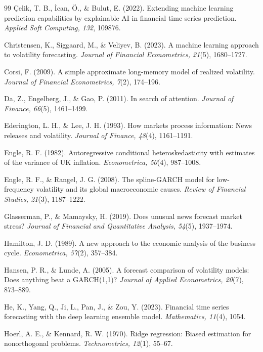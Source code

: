 \documentclass[review]{elsarticle}
\begin{document}
\begin{thebibliography}{99}
\c{C}elik, T. B., \.{I}can, \"{O}., \& Bulut, E. (2022). Extending machine learning prediction capabilities by explainable AI in financial time series prediction. \emph{Applied Soft Computing, 132}, 109876.

Christensen, K., Siggaard, M., \& Veliyev, B. (2023). A machine learning approach to volatility forecasting. \emph{Journal of Financial Econometrics, 21}(5), 1680--1727.

Corsi, F. (2009). A simple approximate long-memory model of realized volatility. \emph{Journal of Financial Econometrics, 7}(2), 174--196.

Da, Z., Engelberg, J., \& Gao, P. (2011). In search of attention. \emph{Journal of Finance, 66}(5), 1461--1499.

Ederington, L. H., \& Lee, J. H. (1993). How markets process information: News releases and volatility. \emph{Journal of Finance, 48}(4), 1161--1191.

Engle, R. F. (1982). Autoregressive conditional heteroskedasticity with estimates of the variance of UK inflation. \emph{Econometrica, 50}(4), 987--1008.

Engle, R. F., \& Rangel, J. G. (2008). The spline-GARCH model for low-frequency volatility and its global macroeconomic causes. \emph{Review of Financial Studies, 21}(3), 1187--1222.

Glasserman, P., \& Mamaysky, H. (2019). Does unusual news forecast market stress? \emph{Journal of Financial and Quantitative Analysis, 54}(5), 1937--1974.

Hamilton, J. D. (1989). A new approach to the economic analysis of the business cycle. \emph{Econometrica, 57}(2), 357--384.

Hansen, P. R., \& Lunde, A. (2005). A forecast comparison of volatility models: Does anything beat a GARCH(1,1)? \emph{Journal of Applied Econometrics, 20}(7), 873--889.

He, K., Yang, Q., Ji, L., Pan, J., \& Zou, Y. (2023). Financial time series forecasting with the deep learning ensemble model. \emph{Mathematics, 11}(4), 1054.

Hoerl, A. E., \& Kennard, R. W. (1970). Ridge regression: Biased estimation for nonorthogonal problems. \emph{Technometrics, 12}(1), 55--67.


\end{thebibliography}
\end{document}
